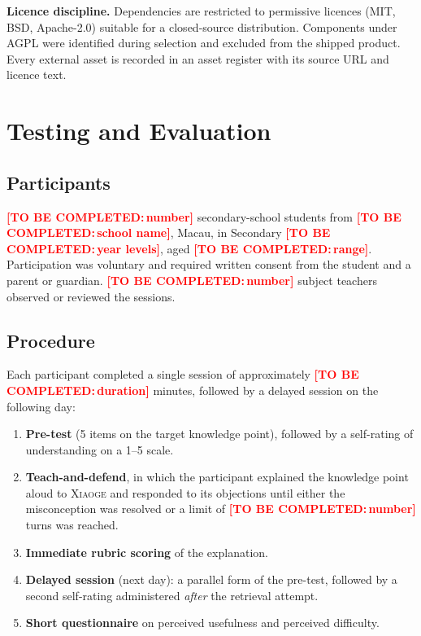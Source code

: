 \documentclass[11pt,a4paper]{article}
\newcommand{\fillin}[1]{\textcolor{red}{\textbf{[TO BE COMPLETED:\,#1]}}}
\newcommand{\xiaoge}{\textsc{Xiaoge}}
\begin{document}
\textbf{Licence discipline.} Dependencies are restricted to permissive licences (MIT, BSD,
Apache-2.0) suitable for a closed-source distribution. Components under AGPL were identified
during selection and excluded from the shipped product. Every external asset is recorded in
an asset register with its source URL and licence text.

\section{Testing and Evaluation}

\subsection{Participants}

\fillin{number} secondary-school students from \fillin{school name}, Macau, in Secondary
\fillin{year levels}, aged \fillin{range}. Participation was voluntary and required written
consent from the student and a parent or guardian. \fillin{number} subject teachers
observed or reviewed the sessions.

\subsection{Procedure}

Each participant completed a single session of approximately \fillin{duration} minutes,
followed by a delayed session on the following day:

\begin{enumerate}
  \item \textbf{Pre-test} (5 items on the target knowledge point), followed by a self-rating
  of understanding on a 1--5 scale.
  \item \textbf{Teach-and-defend}, in which the participant explained the knowledge point
  aloud to \xiaoge{} and responded to its objections until either the misconception was
  resolved or a limit of \fillin{number} turns was reached.
  \item \textbf{Immediate rubric scoring} of the explanation.
  \item \textbf{Delayed session} (next day): a parallel form of the pre-test, followed by a
  second self-rating administered \emph{after} the retrieval attempt.
  \item \textbf{Short questionnaire} on perceived usefulness and perceived difficulty.
\end{enumerate}
\end{document}
